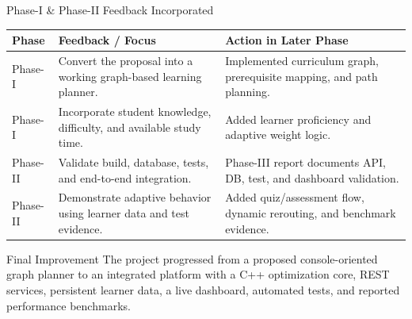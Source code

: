 \documentclass[aspectratio=169,11pt]{beamer}
\begin{document}
\begin{frame}{Phase-I \& Phase-II Feedback Incorporated}
\scriptsize
\begin{center}
\renewcommand{\arraystretch}{1.3}
\begin{tabularx}{.96\textwidth}{@{}p{1.7cm}X X@{}}
\toprule
\textbf{Phase} & \textbf{Feedback / Focus} & \textbf{Action in Later Phase}\\
\midrule
Phase-I & Convert the proposal into a working graph-based learning planner. & Implemented curriculum graph, prerequisite mapping, and path planning.\\
Phase-I & Incorporate student knowledge, difficulty, and available study time. & Added learner proficiency and adaptive weight logic.\\
Phase-II & Validate build, database, tests, and end-to-end integration. & Phase-III report documents API, DB, test, and dashboard validation.\\
Phase-II & Demonstrate adaptive behavior using learner data and test evidence. & Added quiz/assessment flow, dynamic rerouting, and benchmark evidence.\\
\bottomrule
\end{tabularx}
\end{center}
\begin{block}{Final Improvement}
The project progressed from a proposed console-oriented graph planner to an integrated platform with a C++ optimization core, REST services, persistent learner data, a live dashboard, automated tests, and reported performance benchmarks.
\end{block}
\end{frame}
\end{document}
